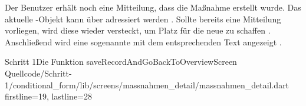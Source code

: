 Der Benutzer erhält noch eine Mitteilung,
dass die Maßnahme erstellt wurde.
Das aktuelle -Objekt kann über  adressiert werden . Sollte bereits eine Mitteilung vorliegen,
wird diese wieder versteckt,
um Platz für die neue zu schaffen . Anschließend wird eine sogenannte  mit dem entsprechenden Text angezeigt .

\begin{alexlisting}{Schritt 1}{Die Funktion saveRecordAndGoBackToOverviewScreen}
  {Quellcode/Schritt-1/conditional_form/lib/screens/massnahmen_detail/massnahmen_detail.dart}
  {firstline=19, lastline=28}
  \label{lst:Schritt1SaveRecord}
\end{alexlisting}



